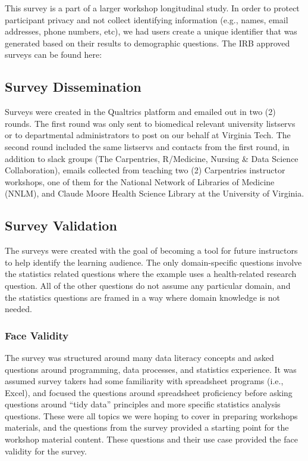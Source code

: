 \documentclass[020-persona\_validation.tex]{subfiles}
\begin{document}
        This survey is a part of a larger workshop longitudinal study.
        In order to protect participant privacy and not collect identifying information
        (e.g., names, email addresses, phone numbers, etc),
        we had users create a unique identifier that was generated based on their results to demographic questions.
        The IRB approved surveys can be found here:

    \subsection{Survey Dissemination}

        Surveys were created in the Qualtrics platform and emailed out in two (2) rounds.
        The first round was only sent to biomedical relevant university listservs
        or to departmental administrators to post on our behalf at Virginia Tech.
        The second round included the same listservs and contacts from the first round,
        in addition to slack groups (The Carpentries, R/Medicine, Nursing \& Data Science Collaboration),
        emails collected from teaching two (2) Carpentries instructor workshops,
        one of them for the National Network of Libraries of Medicine (NNLM),
        and
        Claude Moore Health Science Library at the University of Virginia.

    \subsection{Survey Validation}

        The surveys were created with the goal of becoming a tool for future instructors
        to help identify the learning audience.
        The only domain-specific questions involve the statistics related questions
        where the example uses a health-related research question.
        All of the other questions do not assume any particular domain,
        and the statistics questions are framed in a way where domain knowledge is not needed.

    \subsubsection{Face Validity}

       The survey was structured around many data literacy concepts and asked questions around
        programming, data processes, and statistics experience.
        It was assumed survey takers had some familiarity with spreadsheet programs (i.e., Excel),
        and focused the questions around spreadsheet proficiency before asking questions
        around ``tidy data'' principles and more specific statistics analysis questions.
        These were all topics we were hoping to cover in preparing workshops materials,
        and the questions from the survey provided a starting point for the workshop material content.
        These questions and their use case provided the face validity for the survey.
\end{document}
